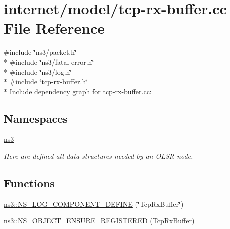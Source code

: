 \hypertarget{tcp-rx-buffer_8cc}{}\section{internet/model/tcp-\/rx-\/buffer.cc File Reference}
\label{tcp-rx-buffer_8cc}
{\ttfamily \#include \char`\"{}ns3/packet.\+h\char`\"{}}\\*
{\ttfamily \#include \char`\"{}ns3/fatal-\/error.\+h\char`\"{}}\\*
{\ttfamily \#include \char`\"{}ns3/log.\+h\char`\"{}}\\*
{\ttfamily \#include \char`\"{}tcp-\/rx-\/buffer.\+h\char`\"{}}\\*
Include dependency graph for tcp-\/rx-\/buffer.cc\+:
\subsection*{Namespaces}
\begin{DoxyCompactItemize}
\item 
 \hyperlink{namespacens3}{ns3}
\begin{DoxyCompactList}\small\item\em Here are defined all data structures needed by an O\+L\+SR node. \end{DoxyCompactList}\end{DoxyCompactItemize}
\subsection*{Functions}
\begin{DoxyCompactItemize}
\item 
\hyperlink{namespacens3_adf4df31b3bbb7d67aa300e75da2e551a}{ns3\+::\+N\+S\+\_\+\+L\+O\+G\+\_\+\+C\+O\+M\+P\+O\+N\+E\+N\+T\+\_\+\+D\+E\+F\+I\+NE} (\char`\"{}Tcp\+Rx\+Buffer\char`\"{})
\item 
\hyperlink{namespacens3_aaea53c607a8964d13c8984f8e9b435f3}{ns3\+::\+N\+S\+\_\+\+O\+B\+J\+E\+C\+T\+\_\+\+E\+N\+S\+U\+R\+E\+\_\+\+R\+E\+G\+I\+S\+T\+E\+R\+ED} (Tcp\+Rx\+Buffer)
\end{DoxyCompactItemize}
